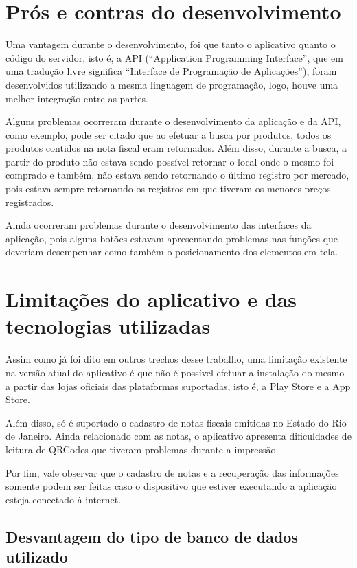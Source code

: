 \section{Prós e contras do desenvolvimento}

Uma vantagem durante o desenvolvimento, foi que tanto o aplicativo quanto o código do servidor, isto é, a API (``Application Programming Interface'', que em uma tradução livre significa ``Interface de Programação de Aplicações''), foram desenvolvidos utilizando a mesma linguagem de programação, logo, houve uma melhor integração entre as partes.

Alguns problemas ocorreram durante o desenvolvimento da aplicação e da API, como exemplo, pode ser citado que ao efetuar a busca por produtos, todos os produtos contidos na nota fiscal eram retornados. Além disso, durante a busca, a partir do produto não estava sendo possível retornar o local onde o mesmo foi comprado e também, não estava sendo retornando o último registro por mercado, pois estava sempre retornando os registros em que tiveram os menores preços registrados.

Ainda ocorreram problemas durante o desenvolvimento das interfaces da aplicação, pois alguns botões estavam apresentando problemas nas funções que deveriam desempenhar como também o posicionamento dos elementos em tela.

\section{Limitações do aplicativo e das tecnologias utilizadas}

Assim como já foi dito em outros trechos desse trabalho, uma limitação existente na versão atual do aplicativo é que não é possível efetuar a instalação do mesmo a partir das lojas oficiais das plataformas suportadas, isto é, a Play Store e a App Store.

Além disso, só é suportado o cadastro de notas fiscais emitidas no Estado do Rio de Janeiro. Ainda relacionado com as notas, o aplicativo apresenta dificuldades de leitura de QRCodes que tiveram problemas durante a impressão.

Por fim, vale observar que o cadastro de notas e a recuperação das informações somente podem ser feitas caso o dispositivo que estiver executando a aplicação esteja conectado à internet.

\subsection{Desvantagem do tipo de banco de dados utilizado}


